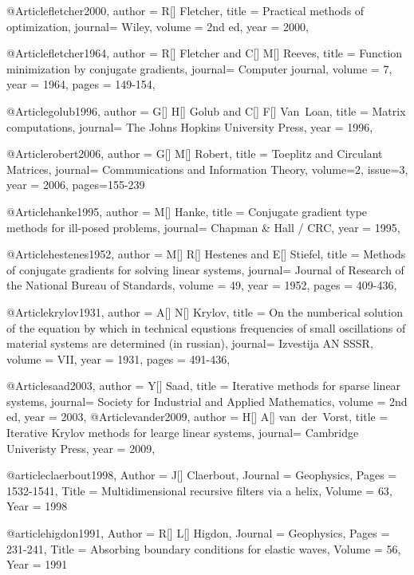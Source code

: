 {@Article{fletcher2000,
  author = 	 {R[] Fletcher},
  title  = 	 {Practical methods of optimization},
  journal= 	 {Wiley},
  volume =	 {2nd ed},
  year   = 	 2000,
}

@Article{fletcher1964,
  author = 	 {R[] Fletcher and C[] M[] Reeves},
  title  = 	 {Function minimization by conjugate gradients},
  journal= 	 {Computer journal},
  volume =	 {7},
  year   = 	 1964,
  pages = 149-154,
}

@Article{golub1996,
  author = 	 {G[] H[] Golub and C[] F[] Van~Loan},
  title  = 	 {Matrix computations},
  journal= 	 {The Johns Hopkins University Press},
  year   = 	 1996,
}

@Article{robert2006,
  author = 	 {G[] M[] Robert},
  title  = 	 {Toeplitz and Circulant Matrices},
  journal= 	 {Communications and Information Theory},
  volume=2,
  issue=3,
  year   = 	 2006,
  pages={155-239}
}

@Article{hanke1995,
  author = 	 {M[] Hanke},
  title  = 	 {Conjugate gradient type methods for ill-posed problems},
  journal= 	 {Chapman \& Hall / CRC},
  year   = 	 1995,
}

@Article{hestenes1952,
  author = 	 {M[] R[] Hestenes and E[] Stiefel},
  title  = 	 {Methods of conjugate gradients for solving linear systems},
  journal= 	 {Journal of Research of the National Bureau of Standards},
  volume =	 {49},
  year   = 	 1952,
  pages = 	 409-436,
}

@Article{krylov1931,
  author = 	 {A[] N[] Krylov},
  title  = 	 {On the numberical solution of the equation by which in technical equstions frequencies of small oscillations of material systems are determined (in russian)},
  journal= 	 {Izvestija AN SSSR},
  volume =	 {VII},
  year   = 	 1931,
  pages = 491-436,
}

@Article{saad2003,
  author = 	 {Y[] Saad},
  title  = 	 {Iterative methods for sparse linear systems},
  journal= 	 {Society for Industrial and Applied Mathematics},
  volume =	 {2nd ed},
  year   = 	 2003,
}
@Article{vander2009,
  author = 	 {H[] A[] van~der~Vorst},
  title  = 	 {Iterative Krylov methods for learge linear systems},
  journal= 	 {Cambridge Univeristy Press},
  year   = 	 2009,
}


@article{claerbout1998,
	Author = {J[] Claerbout},
	Journal = {Geophysics},
	Pages = {1532-1541},
	Title = {Multidimensional recursive filters via a helix},
	Volume = {63},
	Year = {1998}}

@article{higdon1991,
	Author = {R[] L[] Higdon},
	Journal = {Geophysics},
	Pages = {231-241},
	Title = {Absorbing boundary conditions for elastic waves},
	Volume = {56},
	Year = {1991}}
	



}
